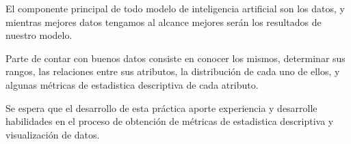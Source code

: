 El componente principal de todo modelo de inteligencia artificial son los datos, y mientras mejores datos tengamos al alcance mejores serán los resultados de nuestro modelo.

Parte de contar con buenos datos consiste en conocer los mismos, determinar sus rangos, las relaciones entre sus atributos, la distribución de cada uno de ellos, y algunas métricas de estadistica descriptiva de cada atributo.

Se espera que el desarrollo de esta práctica aporte experiencia y desarrolle habilidades en el proceso de obtención de métricas de estadistica descriptiva y visualización de datos.
